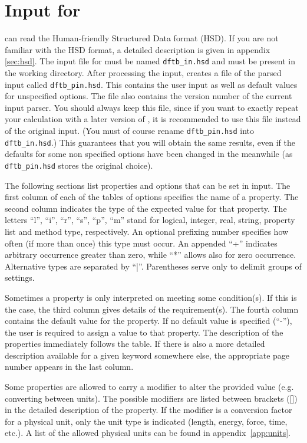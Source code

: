 
\chapter{Input for {\dftbp}}


{\dftbp} can read the Human-friendly Structured Data format (HSD).  If you are
not familiar with the HSD format, a detailed description is given in appendix
\ref{sec:hsd}. The input file for {\dftbp} must be named \verb|dftb_in.hsd| and
must be present in the working directory. After processing the input, {\dftbp}
creates a file of the parsed input called \verb|dftb_pin.hsd|. This contains the
user input as well as default values for unspecified options.  The file also
contains the version number of the current input parser.  You should always keep
this file, since if you want to exactly repeat your calculation with a later
version of \dftbp{}, it is recommended to use this file instead of the original
input. (You must of course rename \verb|dftb_pin.hsd| into \verb|dftb_in.hsd|.)
This guarantees that you will obtain the same results, even if the defaults for
some non specified options have been changed in the meanwhile (as
\verb|dftb_pin.hsd| stores the original choice).

The following sections list properties and options that can be set in
{\dftbp} input. The first column of each of the tables of options
specifies the name of a property. The second column indicates the type
of the expected value for that property.  The letters ``l'', ``i'',
``r'', ``s'', ``p'', ``m'' stand for logical, integer, real, string,
property list and method type, respectively. An optional prefixing
number specifies how often (if more than once) this type must occur.
An appended ``+'' indicates arbitrary occurrence greater than zero,
while ``*'' allows also for zero occurrence.  Alternative types are
separated by ``|''.  Parentheses serve only to delimit groups of
settings.

Sometimes a property is only interpreted on meeting some condition(s).  If this
is the case, the third column gives details of the requirement(s). The
fourth column contains the default value for the property.  If no default value
is specified (``-''), the user is required to assign a value to that property.
The description of the properties immediately follows the table.  If there is
also a more detailed description available for a given keyword somewhere else,
the appropriate page number appears in the last column.

Some properties are allowed to carry a modifier to alter the provided
value (e.g. converting between units). The possible modifiers are
listed between brackets ([]) in the detailed description of the
property. If the modifier is a conversion factor for a physical unit,
only the unit type is indicated (length, energy, force, time, etc.). A
list of the allowed physical units can be found in
appendix~\ref{app:units}.

